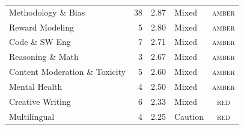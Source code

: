 \begin{tabular}{@{}l r c l c@{}}
Methodology \& Bias & 38 & 2.87 & Mixed & \cellcolor{a!60}\textsc{amber} \\
Reward Modeling & 5 & 2.80 & Mixed & \cellcolor{a!60}\textsc{amber} \\
Code \& SW Eng & 7 & 2.71 & Mixed & \cellcolor{a!60}\textsc{amber} \\
Reasoning \& Math & 3 & 2.67 & Mixed & \cellcolor{a!60}\textsc{amber} \\
Content Moderation \& Toxicity & 5 & 2.60 & Mixed & \cellcolor{a!60}\textsc{amber} \\
Mental Health & 4 & 2.50 & Mixed & \cellcolor{a!60}\textsc{amber} \\
Creative Writing & 6 & 2.33 & Mixed & \cellcolor{r!55}\textsc{red} \\
Multilingual & 4 & 2.25 & Caution & \cellcolor{r!55}\textsc{red} \\
\bottomrule
\end{tabular}